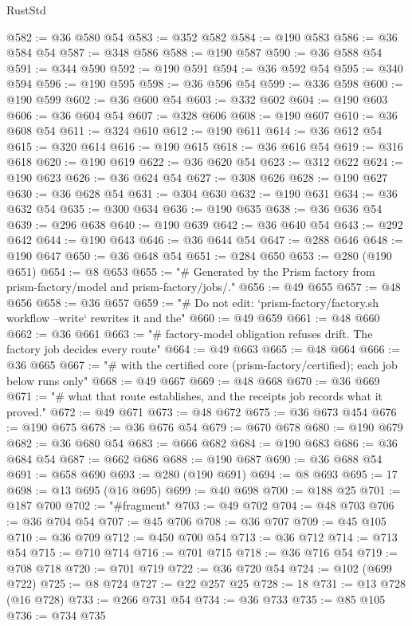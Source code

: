 \begin{lexlean}{RustStd}
\begin{coremodule}
@582 := @36 @580 @54
@583 := @352 @582
@584 := @190 @583
@586 := @36 @584 @54
@587 := @348 @586
@588 := @190 @587
@590 := @36 @588 @54
@591 := @344 @590
@592 := @190 @591
@594 := @36 @592 @54
@595 := @340 @594
@596 := @190 @595
@598 := @36 @596 @54
@599 := @336 @598
@600 := @190 @599
@602 := @36 @600 @54
@603 := @332 @602
@604 := @190 @603
@606 := @36 @604 @54
@607 := @328 @606
@608 := @190 @607
@610 := @36 @608 @54
@611 := @324 @610
@612 := @190 @611
@614 := @36 @612 @54
@615 := @320 @614
@616 := @190 @615
@618 := @36 @616 @54
@619 := @316 @618
@620 := @190 @619
@622 := @36 @620 @54
@623 := @312 @622
@624 := @190 @623
@626 := @36 @624 @54
@627 := @308 @626
@628 := @190 @627
@630 := @36 @628 @54
@631 := @304 @630
@632 := @190 @631
@634 := @36 @632 @54
@635 := @300 @634
@636 := @190 @635
@638 := @36 @636 @54
@639 := @296 @638
@640 := @190 @639
@642 := @36 @640 @54
@643 := @292 @642
@644 := @190 @643
@646 := @36 @644 @54
@647 := @288 @646
@648 := @190 @647
@650 := @36 @648 @54
@651 := @284 @650
@653 := @280 (@190 @651)
@654 := @8 @653
@655 := "# Generated by the Prism factory from prism-factory/model and prism-factory/jobs/."
@656 := @49 @655
@657 := @48 @656
@658 := @36 @657
@659 := "# Do not edit: `prism-factory/factory.sh workflow --write` rewrites it and the"
@660 := @49 @659
@661 := @48 @660
@662 := @36 @661
@663 := "# factory-model obligation refuses drift. The factory job decides every route"
@664 := @49 @663
@665 := @48 @664
@666 := @36 @665
@667 := "# with the certified core (prism-factory/certified); each job below runs only"
@668 := @49 @667
@669 := @48 @668
@670 := @36 @669
@671 := "# what that route establishes, and the receipts job records what it proved."
@672 := @49 @671
@673 := @48 @672
@675 := @36 @673 @454
@676 := @190 @675
@678 := @36 @676 @54
@679 := @670 @678
@680 := @190 @679
@682 := @36 @680 @54
@683 := @666 @682
@684 := @190 @683
@686 := @36 @684 @54
@687 := @662 @686
@688 := @190 @687
@690 := @36 @688 @54
@691 := @658 @690
@693 := @280 (@190 @691)
@694 := @8 @693
@695 := 17
@698 := @13 @695 (@16 @695)
@699 := @40 @698
@700 := @188 @25
@701 := @187 @700
@702 := "#fragment"
@703 := @49 @702
@704 := @48 @703
@706 := @36 @704 @54
@707 := @45 @706
@708 := @36 @707
@709 := @45 @105
@710 := @36 @709
@712 := @450 @700 @54
@713 := @36 @712
@714 := @713 @54
@715 := @710 @714
@716 := @701 @715
@718 := @36 @716 @54
@719 := @708 @718
@720 := @701 @719
@722 := @36 @720 @54
@724 := @102 (@699 @722)
@725 := @8 @724
@727 := @22 @257 @25
@728 := 18
@731 := @13 @728 (@16 @728)
@733 := @266 @731 @54
@734 := @36 @733
@735 := @85 @105
@736 := @734 @735

\end{coremodule}
\end{lexlean}
